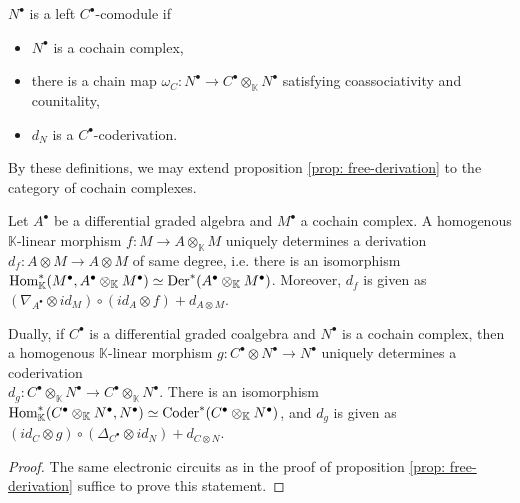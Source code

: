\documentclass[../thesis.tex]{subfiles}
\begin{document}
            \begin{definition}
                $N^\bullet$ is a left $C^\bullet$-comodule if
                \begin{itemize}
                    \item $N^\bullet$ is a cochain complex,
                    \item there is a chain map $\omega_C : N^\bullet \rightarrow C^\bullet \otimes_\mathbb{K} N^\bullet$ satisfying coassociativity and counitality,
                    \item $d_N$ is a $C^\bullet$-coderivation.
                \end{itemize}
            \end{definition}

            By these definitions, we may extend proposition \ref{prop: free-derivation} to the category of cochain complexes.

            \begin{corollary}\label{cor: dg-free-derivation}
                Let $A^\bullet$ be a differential graded algebra and $M^\bullet$ a cochain complex. A homogenous $\mathbb{K}$-linear morphism $f:M\rightarrow A\otimes_{\mathbb{K}} M$ uniquely determines a derivation \\ $d_f:A\otimes M\rightarrow A\otimes M$ of same degree, i.e. there is an isomorphism \\ $\tt{Hom}_{\mathbb{K}}^*(M^\bullet,A^\bullet\otimes_{\mathbb{K}}M^\bullet)\simeq \tt{Der}^*(A^\bullet\otimes_{\mathbb{K}}M^\bullet)$. Moreover, $d_f$ is given as $(\nabla_{A^\bullet}\otimes id_M)\circ (id_A\otimes f) + d_{A\otimes M}$.

                Dually, if $C^\bullet$ is a differential graded coalgebra and $N^\bullet$ is a cochain complex, then a homogenous $\mathbb{K}$-linear morphism $g:C^\bullet\otimes N^\bullet\rightarrow N^\bullet$ uniquely determines a coderivation \\ $d_g:C^\bullet\otimes_{\mathbb{K}}N^\bullet\rightarrow C^\bullet\otimes_{\mathbb{K}}N^\bullet$. There is an isomorphism $\tt{Hom}_{\mathbb{K}}^*(C^\bullet\otimes_{\mathbb{K}}N^\bullet,N^\bullet)\simeq \tt{Coder}^*(C^\bullet\otimes_{\mathbb{K}}N^\bullet)$, and $d_g$ is given as $(id_C\otimes g)\circ (\Delta_{C^\bullet}\otimes id_N) + d_{C\otimes N}$.
            \end{corollary}

            \begin{proof}
                The same electronic circuits as in the proof of proposition \ref{prop: free-derivation} suffice to prove this statement.
            \end{proof}
\end{document}
